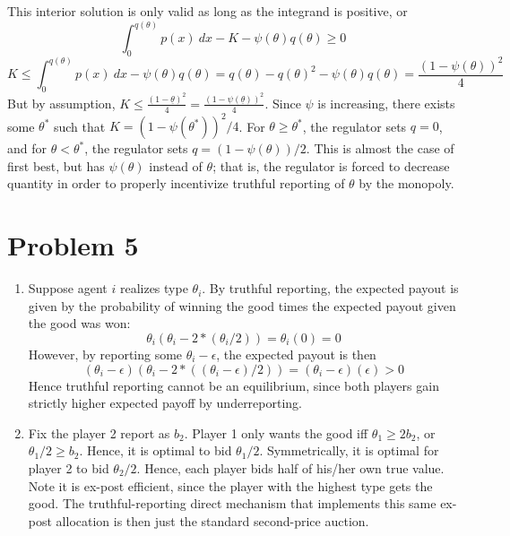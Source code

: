 \documentclass[10pt,letter]{article}
\begin{document}
\begin{enumerate}[label=(\alph*)]
This interior solution is only valid as long as the integrand is positive, or
\[ \int_0^{q(\theta)}p(x) \ dx - K - \psi(\theta) q(\theta) \ge 0 \]
\[ K \le \int_0^{q(\theta)}p(x) \ dx - \psi(\theta) q(\theta) = q(\theta) - q(\theta)^2 - \psi(\theta)q(\theta) = \frac{(1-\psi(\theta))^2}{4} \]
But by assumption, $K \le \frac{(1-\underline{\theta})^2}{4} = \frac{(1-\psi(\underline{\theta}))^2}{4}$. Since $\psi$ is increasing, there exists some $\theta^*$ such that $K = (1-\psi(\theta^*))^2/4$. For $\theta \ge \theta^*$, the regulator sets $q = 0$, and for $\theta < \theta^*$, the regulator sets $q = (1-\psi(\theta))/2$.
This is almost the case of first best, but has $\psi(\theta)$ instead of $\theta$; that is, the regulator is forced to decrease quantity in order to properly incentivize truthful reporting of $\theta$ by the monopoly.
\end{enumerate}
\section*{Problem 5}
\begin{enumerate}[label=(\alph*)]
\item Suppose agent $i$ realizes type $\theta_i$. By truthful reporting, the expected payout is given by the probability of winning the good times the expected payout given the good was won:
\[ \theta_i \left(\theta_i - 2 * (\theta_i/2)\right) = \theta_i (0) = 0 \]
However, by reporting some $\theta_i - \epsilon$, the expected payout is then
\[ (\theta_i - \epsilon) \left(\theta_i  - 2 * ((\theta_i - \epsilon)/2)\right) = (\theta_i - \epsilon) (\epsilon) > 0 \]
Hence truthful reporting cannot be an equilibrium, since both players gain strictly higher expected payoff by underreporting.
\item Fix the player 2 report as $b_2$. Player 1 only wants the good iff $\theta_1 \ge 2b_2$, or $\theta_1/2 \ge b_2$. Hence, it is optimal to bid $\theta_1/2$. Symmetrically, it is optimal for player 2 to bid $\theta_2/2$. Hence, each player bids half of his/her own true value. Note it is ex-post efficient, since the player with the highest type gets the good. The truthful-reporting direct mechanism that implements this same ex-post allocation is then just the standard second-price auction.
\end{enumerate}
\end{document}
